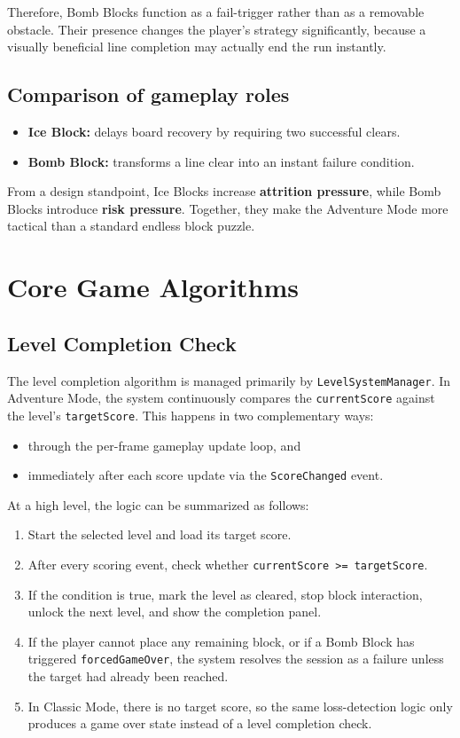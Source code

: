 \documentclass[a4paper,12pt]{report}
\begin{document}
Therefore, Bomb Blocks function as a fail-trigger rather than as a removable obstacle. Their presence changes the player's strategy significantly, because a visually beneficial line completion may actually end the run instantly.

\subsection{Comparison of gameplay roles}
\begin{itemize}
    \item \textbf{Ice Block:} delays board recovery by requiring two successful clears.
    \item \textbf{Bomb Block:} transforms a line clear into an instant failure condition.
\end{itemize}

From a design standpoint, Ice Blocks increase \textbf{attrition pressure}, while Bomb Blocks introduce \textbf{risk pressure}. Together, they make the Adventure Mode more tactical than a standard endless block puzzle.

\section{Core Game Algorithms}
\subsection{Level Completion Check}
The level completion algorithm is managed primarily by \texttt{LevelSystemManager}. In Adventure Mode, the system continuously compares the \texttt{currentScore} against the level's \texttt{targetScore}. This happens in two complementary ways:
\begin{itemize}
    \item through the per-frame gameplay update loop, and
    \item immediately after each score update via the \texttt{ScoreChanged} event.
\end{itemize}

At a high level, the logic can be summarized as follows:
\begin{enumerate}
    \item Start the selected level and load its target score.
    \item After every scoring event, check whether \texttt{currentScore >= targetScore}.
    \item If the condition is true, mark the level as cleared, stop block interaction, unlock the next level, and show the completion panel.
    \item If the player cannot place any remaining block, or if a Bomb Block has triggered \texttt{forcedGameOver}, the system resolves the session as a failure unless the target had already been reached.
    \item In Classic Mode, there is no target score, so the same loss-detection logic only produces a game over state instead of a level completion check.
\end{enumerate}
\end{document}
